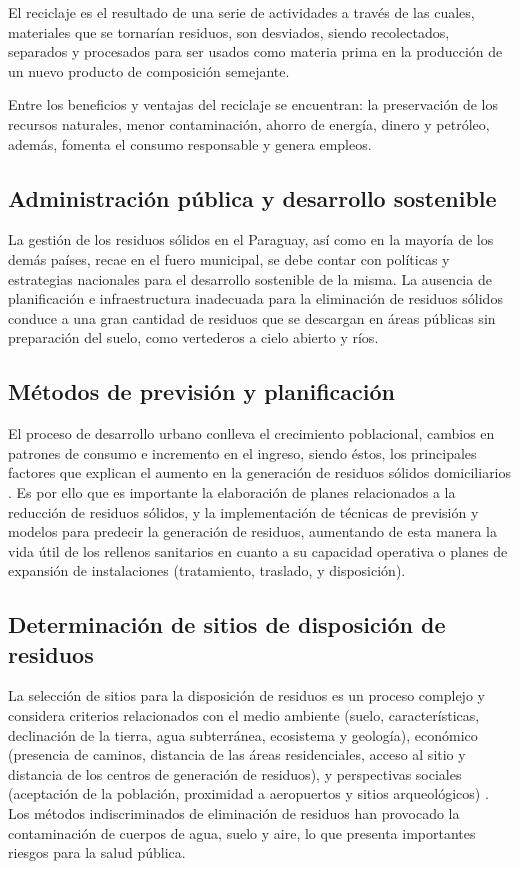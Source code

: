 El reciclaje es el resultado de una serie de actividades a través de las cuales, materiales que se tornarían residuos, son desviados, siendo recolectados, separados y procesados para ser usados como materia prima en la producción de un nuevo producto de composición semejante.

Entre los beneficios y ventajas del reciclaje se encuentran: la preservación de los recursos naturales, menor contaminación, ahorro de energía, dinero y petróleo, además, fomenta el consumo responsable y genera empleos.

\subsection{Administración pública y desarrollo sostenible}

La gestión de los residuos sólidos en el Paraguay, así como en la mayoría de los demás países, recae en el fuero municipal, se debe contar con políticas y estrategias nacionales para el desarrollo sostenible de la misma. La ausencia de planificación e infraestructura inadecuada para la eliminación de residuos sólidos conduce a una gran cantidad de residuos que se descargan en áreas públicas sin preparación del suelo, como vertederos a cielo abierto y ríos.

\subsection{Métodos de previsión y planificación}

El proceso de desarrollo urbano conlleva el crecimiento poblacional, cambios en patrones de consumo e incremento en el ingreso, siendo éstos, los principales factores que explican el aumento en la generación de residuos sólidos domiciliarios \citep{Vasquez2005ModeloChile}. Es por ello que es importante la elaboración de planes relacionados a la reducción de residuos sólidos, y la implementación de técnicas de previsión y modelos para predecir la generación de residuos, aumentando de esta manera la vida útil de los rellenos sanitarios en cuanto a su capacidad operativa o planes de expansión de instalaciones (tratamiento, traslado, y disposición).

\subsection{Determinación de sitios de disposición de residuos}

La selección de sitios para la disposición de residuos es un proceso complejo y considera criterios relacionados con el medio ambiente (suelo, características, declinación de la tierra, agua subterránea, ecosistema y geología), económico (presencia de caminos, distancia de las áreas residenciales, acceso al sitio y distancia de los centros de generación de residuos), y perspectivas sociales (aceptación de la población, proximidad a aeropuertos y sitios arqueológicos) \citep{Gbanie2013ModellingLeone}. Los métodos indiscriminados de eliminación de residuos han provocado la contaminación de cuerpos de agua, suelo y aire, lo que presenta importantes riesgos para la salud pública.

